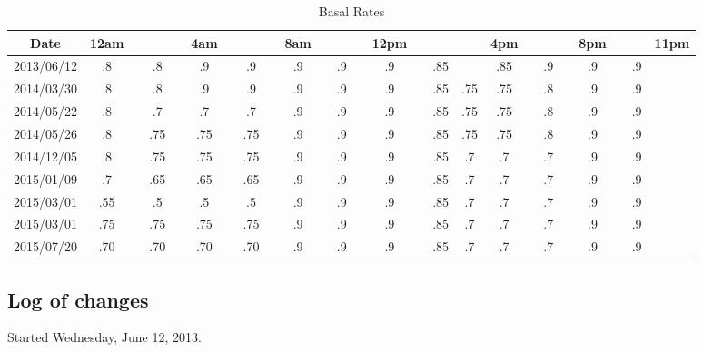\begin{table}[h]
\caption{Basal Rates}
\footnotesize
\begin{center}
\begin{tabular}{|c|c|c|c|c|c|c|c|c|c|c|c|c|c|c|c|c|c|c|c|c|c|c|c|c|}
\hline
Date       & 12am & &    & & 4am & &     & & 8am & &    & & 12pm & &     &     & 4pm & &    & & 8pm & &    & 11pm \\ \hline
2013/06/12 & .8   & & .8 & & .9  & & .9  & & .9  & & .9 & & .9   & & .85 &     & .85 & & .9 & & .9  & & .9 &      \\
2014/03/30 & .8   & & .8 & & .9  & & .9  & & .9  & & .9 & & .9   & & .85 & .75 & .75 & & .8 & & .9  & & .9 &      \\
2014/05/22 & .8   & & .7 & & .7  & & .7  & & .9  & & .9 & & .9   & & .85 & .75 & .75 & & .8 & & .9  & & .9 &      \\
2014/05/26 & .8   & & .75& & .75 & & .75 & & .9  & & .9 & & .9   & & .85 & .75 & .75 & & .8 & & .9  & & .9 &      \\
2014/12/05 & .8   & & .75& & .75 & & .75 & & .9  & & .9 & & .9   & & .85 & .7  & .7  & & .7 & & .9  & & .9 &      \\
2015/01/09 & .7   & & .65& & .65 & & .65 & & .9  & & .9 & & .9   & & .85 & .7  & .7  & & .7 & & .9  & & .9 &      \\
2015/03/01 & .55  & & .5 & & .5  & & .5  & & .9  & & .9 & & .9   & & .85 & .7  & .7  & & .7 & & .9  & & .9 &      \\
2015/03/01 & .75  & & .75& & .75 & & .75 & & .9  & & .9 & & .9   & & .85 & .7  & .7  & & .7 & & .9  & & .9 &      \\
2015/07/20 & .70  & & .70& & .70 & & .70 & & .9  & & .9 & & .9   & & .85 & .7  & .7  & & .7 & & .9  & & .9 &      \\
\hline
\end{tabular}
\end{center}
\label{default}
\end{table}%

\subsection{Log of changes}
Started Wednesday, June 12, 2013.

